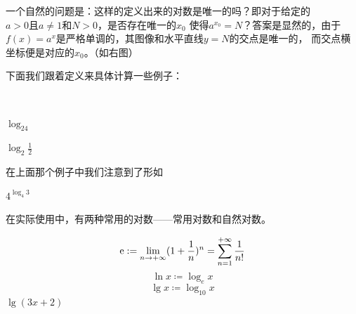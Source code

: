 \begin{minipage}{0.65\textwidth}

    一个自然的问题是：这样的定义出来的对数是唯一的吗？即对于给定的$a>0\text{且}a\neq1$和$N>0$，是否存在唯一的$x_0$
    使得$a^{x_0}=N$？答案是显然的，由于$f(x)=a^{x}$是严格单调的，其图像和水平直线$y=N$的交点是唯一的，
    而交点横坐标便是对应的$x_0$。（如右图）  
\end{minipage}%
\hfill%
\begin{minipage}{0.25\textwidth}
\end{minipage}

下面我们跟着定义来具体计算一些例子：
\begin{example}
    \ 

    $\log_24$

    $\log_2\frac{1}{2}$
\end{example}
在上面那个例子中我们注意到了形如
\begin{theorem}[对数恒等式]
    
\end{theorem}
\begin{example}
    $4^{\log_4 3}$
\end{example}
在实际使用中，有两种常用的对数——常用对数和自然对数。
\begin{definition}[自然对数与常用对数]
    

    \[\mathrm{e}:=\lim_{n\rightarrow +\infty}(1+\frac{1}{n})^n
    =\sum_{n=1}^{+\infty}\frac{1}{n!}\]
    \[\ln x \coloneqq \log _e x\]
    \[\lg x \coloneqq \log _{10} x\]
    $\lg(3x+2)$
\end{definition}

